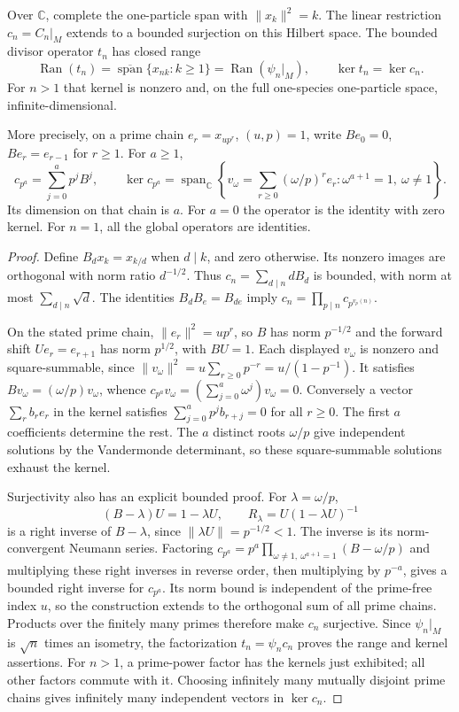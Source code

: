 \begin{theorem}
\label{v4-arith:ado:Hilbert-kernel-range}
Over \(\mathbb C\), complete the one-particle span with
\(\|x_k\|^2=k\). The linear restriction \(c_n=C_n|_M\) extends to
a bounded surjection on this Hilbert space. The bounded divisor
operator \(t_n\) has closed range
\[
 \operatorname{Ran}(t_n)=
 \overline{\operatorname{span}}\{x_{nk}:k\ge1\}
 =\operatorname{Ran}(\psi_n|_M),
 \qquad \ker t_n=\ker c_n.
\]
For \(n>1\) that kernel is nonzero and, on the full one-species
one-particle space, infinite-dimensional.

More precisely, on a prime chain \(e_r=x_{up^r}\), \((u,p)=1\),
write \(Be_0=0\), \(Be_r=e_{r-1}\) for \(r\ge1\). For \(a\ge1\),
\[
 c_{p^a}=\sum_{j=0}^a p^jB^j,
 \qquad
 \ker c_{p^a}=\operatorname{span}_{\mathbb C}
 \left\{v_\omega=\sum_{r\ge0}(\omega/p)^r e_r:
 \omega^{a+1}=1,\ \omega\ne1\right\}.
\]
Its dimension on that chain is \(a\). For \(a=0\) the operator is the
identity with zero kernel. For \(n=1\), all the global operators are
identities.
\end{theorem}
\begin{proof}
Define \(B_d x_k=x_{k/d}\) when \(d\mid k\), and zero otherwise.
Its nonzero images are orthogonal with norm ratio \(d^{-1/2}\).
Thus \(c_n=\sum_{d\mid n}dB_d\) is bounded, with norm at most
\(\sum_{d\mid n}\sqrt d\). The identities \(B_dB_e=B_{de}\) imply
\(c_n=\prod_{p\mid n}c_{p^{v_p(n)}}\).

On the stated prime chain, \(\|e_r\|^2=up^r\), so \(B\) has norm
\(p^{-1/2}\) and the forward shift \(Ue_r=e_{r+1}\) has norm
\(p^{1/2}\), with \(BU=1\). Each displayed \(v_\omega\) is nonzero
and square-summable, since
\(\|v_\omega\|^2=u\sum_{r\ge0}p^{-r}=u/(1-p^{-1})\).
It satisfies \(Bv_\omega=(\omega/p)v_\omega\), whence
\(c_{p^a}v_\omega=(\sum_{j=0}^a\omega^j)v_\omega=0\).
Conversely a vector \(\sum_rb_re_r\) in the kernel satisfies
\(\sum_{j=0}^ap^jb_{r+j}=0\) for all \(r\ge0\).
The first \(a\) coefficients determine the rest. The \(a\) distinct
roots \(\omega/p\) give independent solutions by the Vandermonde
determinant, so these square-summable solutions exhaust the kernel.

Surjectivity also has an explicit bounded proof. For
\(\lambda=\omega/p\),
\[
 (B-\lambda)U=1-\lambda U,\qquad
 R_\lambda=U(1-\lambda U)^{-1}
\]
is a right inverse of \(B-\lambda\), since
\(\|\lambda U\|=p^{-1/2}<1\). The inverse is its norm-convergent
Neumann series. Factoring
\(c_{p^a}=p^a\prod_{\omega\ne1,\ \omega^{a+1}=1}(B-\omega/p)\)
and multiplying these right inverses in reverse order, then multiplying
by \(p^{-a}\), gives a bounded right inverse for \(c_{p^a}\). Its norm bound is independent of the
prime-free index \(u\), so the construction extends to the orthogonal
sum of all prime chains. Products over the finitely many primes
therefore make \(c_n\) surjective. Since \(\psi_n|_M\) is
\(\sqrt n\) times an isometry, the factorization \(t_n=\psi_nc_n\)
proves the range and kernel assertions.
For \(n>1\), a prime-power factor has the kernels just exhibited;
all other factors commute with it. Choosing infinitely many mutually
disjoint prime chains gives infinitely many independent vectors in
\(\ker c_n\).
\end{proof}

